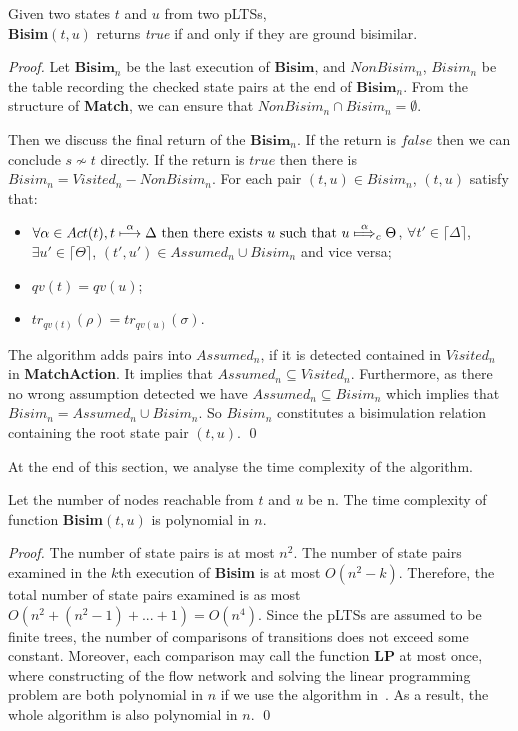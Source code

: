 \documentclass[a4paper,runningheads]{llncs}
\begin{document}
\begin{theorem}[Correctness]\label{thm:correctness}
Given two states $t$ and $u$ from two pLTSs,\\ \textbf{Bisim}$(t,u)$ returns \textit{true} if and only if they are ground bisimilar.
\end{theorem} 
\begin{proof}
Let $\textbf{Bisim}_{n}$ be the last execution of $\textbf{Bisim}$, and $NonBisim_{n}$, $Bisim_{n}$ be the table recording the checked state pairs at the end of $\textbf{Bisim}_{n}$. From the structure of \textbf{Match}, we can ensure that $NonBisim_{n}\cap Bisim_{n}=\emptyset$.

Then we discuss the final return of the $\textbf{Bisim}_{n}$. If the return is $false$ then we can conclude $s\not\sim t$ directly. If the return is $true$ then there is $Bisim_{n} = Visited_{n} - NonBisim_{n}$. For each pair $(t, u)\in Bisim_{n}$, $(t,u)$ satisfy that:
\begin{itemize}
    \item $\forall\alpha\in Act(t), t\overset{\alpha}{\longmapsto}\Delta\text{ then there exists } u \text{ such that } u\overset{\alpha}{\mapstochar\Longrightarrow}_{c}\Theta$, $\forall t'\in\lceil\Delta\rceil$, $\exists u'\in\lceil\Theta\rceil$, $(t', u')\in Assumed_{n}\cup Bisim_{n}$ and vice versa;
    \item $qv(t)=qv(u)$;
    \item $tr_{qv(t)}(\rho)=tr_{qv(u)}(\sigma)$.
\end{itemize}
The algorithm adds pairs into $Assumed_{n}$, if it is detected contained in $Visited_{n}$ in \textbf{MatchAction}. It implies that $Assumed_{n}\subseteq Visited_{n}$. Furthermore, as there no wrong assumption detected we have $Assumed_{n}\subseteq Bisim_{n}$ which implies that $Bisim_{n}=Assumed_{n}\cup Bisim_{n}$. So $Bisim_{n}$ constitutes a bisimulation relation containing the root state pair $(t, u)$.
\qed
\end{proof}

At the end of this section, we analyse the time complexity of the algorithm.

\begin{theorem}[Complexity]\label{thm:complexity}
Let the number of nodes reachable from $t$ and $u$ be n. The time complexity of function \textbf{Bisim}$(t,u)$ is polynomial in $n$. %
\end{theorem}
\begin{proof}
The number of state pairs is at most $n^2$. The number of state pairs examined in the $k$th execution of \textbf{Bisim} is at most $O(n^2-k)$. Therefore, the total number of state pairs examined is as most $O(n^2+(n^2-1)+...+1)=O(n^4)$. Since the pLTSs are assumed to be finite trees, the number of comparisons of transitions does not exceed some constant. Moreover, each comparison may call the function \textbf{LP} at most once, where constructing of the flow network and solving the linear programming problem are both polynomial in $n$ if we use the algorithm in~\cite{TH15}. As a result, the whole algorithm is also polynomial in $n$.
\qed
\end{proof}
\end{document}
